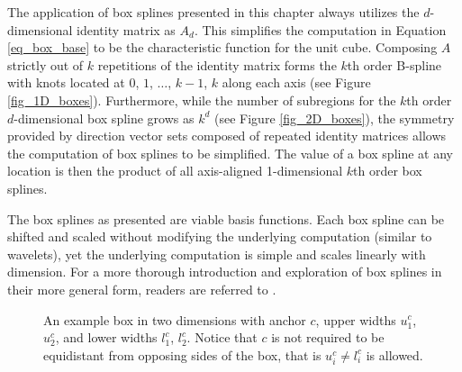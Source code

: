The application of box splines presented in this chapter always utilizes the $d$-dimensional identity matrix as $A_d$. This simplifies the computation in Equation \ref{eq_box_base} to be the characteristic function for the unit cube. Composing $A$ strictly out of $k$ repetitions of the identity matrix forms the $k$th order B-spline with knots located at $0$, $1$, $\ldots$, $k-1$, $k$ along each axis (see Figure \ref{fig_1D_boxes}). Furthermore, while the number of subregions for the $k$th order $d$-dimensional box spline grows as $k^d$ (see Figure \ref{fig_2D_boxes}), the symmetry provided by direction vector sets composed of repeated identity matrices allows the computation of box splines to be simplified. The value of a box spline at any location is then the product of all axis-aligned 1-dimensional $k$th order box splines.

The box splines as presented are viable basis functions. Each box spline can be shifted and scaled without modifying the underlying computation (similar to wavelets), yet the underlying computation is simple and scales linearly with dimension. For a more thorough introduction and exploration of box splines in their more general form, readers are referred to \cite{de2013box}. 

\begin{figure}
  \centering
  \caption{An example box in two dimensions with anchor $c$, upper widths $u^c_1$, $u^c_2$, and lower widths $l^c_1$, $l^c_2$. Notice that $c$ is not required to be equidistant from opposing sides of the box, that is $u^c_i \not= l^c_i$ is allowed.}
  \label{fig_example_box}
\end{figure}

